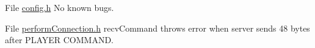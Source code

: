 
\begin{DoxyRefList}
\item[File \mbox{\hyperlink{config_8h}{config.h}} ]\label{bug__bug000001}%
%
No known bugs.  
\item[File \mbox{\hyperlink{performConnection_8h}{perform\+Connection.h}} ]\label{bug__bug000002}%
%
recv\+Command throws error when server sends 48 bytes after PLAYER COMMAND. 
\end{DoxyRefList}